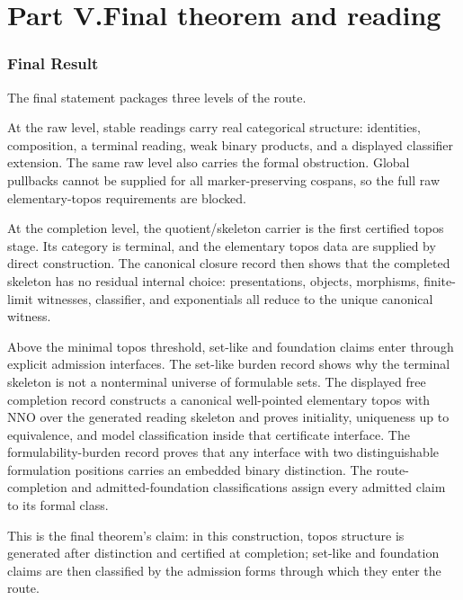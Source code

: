\documentclass[11pt]{article}
\begin{document}
\part*{Part V.\quad Final theorem and reading}

\section{Final Result}

The final statement packages three levels of the route.

At the raw level, stable readings carry real categorical structure:
identities, composition, a terminal reading, weak binary products, and a
displayed classifier extension.  The same raw level also carries the
formal obstruction.  Global pullbacks cannot be supplied for all
marker-preserving cospans, so the full raw elementary-topos requirements
are blocked.

At the completion level, the quotient/skeleton carrier is the first
certified topos stage.  Its category is terminal, and the elementary
topos data are supplied by direct construction.  The canonical closure
record then shows that the completed skeleton has no residual internal
choice: presentations, objects, morphisms, finite-limit witnesses,
classifier, and exponentials all reduce to the unique canonical witness.

Above the minimal topos threshold, set-like and foundation claims enter
through explicit admission interfaces.  The set-like burden record shows
why the terminal skeleton is not a nonterminal universe of formulable
sets.  The displayed free completion record constructs a canonical
well-pointed elementary topos with NNO over the generated reading
skeleton and proves initiality, uniqueness up to equivalence, and model
classification inside that certificate interface.  The
formulability-burden record proves that any interface with two
distinguishable formulation positions carries an embedded binary
distinction.  The route-completion and admitted-foundation
classifications assign every admitted claim to its formal class.

This is the final theorem's claim: in this construction, topos structure
is generated after distinction and certified at completion; set-like and
foundation claims are then classified by the admission forms through
which they enter the route.
\end{document}

